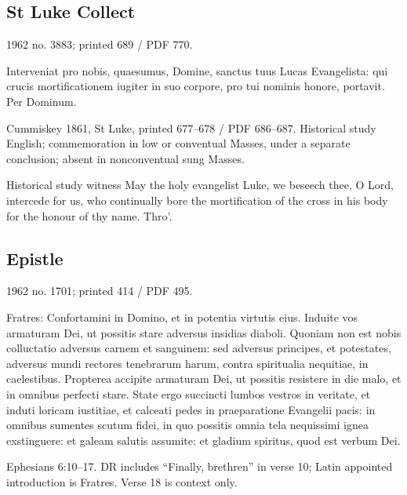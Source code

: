 \subsection{St Luke Collect}
\label{proper-luke-collect}

1962 no. 3883; printed 689 / PDF 770.

\begin{latinproper}
Interveniat pro nobis, quaesumus, Domine, sanctus tuus Lucas Evangelista: qui crucis mortificationem iugiter in suo corpore, pro tui nominis honore, portavit. Per Dominum.
\end{latinproper}

Cummiskey 1861, St Luke, printed 677–678 / PDF 686–687. Historical study English; commemoration in low or conventual Masses, under a separate conclusion; absent in nonconventual sung Masses.

\begin{englishwitness}{Historical study witness}
May the holy evangelist Luke, we beseech thee, O Lord, intercede for us, who continually bore the mortification of the cross in his body for the honour of thy name. Thro’.
\end{englishwitness}

\subsection{Epistle}
\label{proper-epistle}

1962 no. 1701; printed 414 / PDF 495.

\begin{latinproper}
Fratres: Confortamini in Domino, et in potentia virtutis eius. Induite vos armaturam Dei, ut possitis stare adversus insidias diaboli. Quoniam non est nobis colluctatio adversus carnem et sanguinem: sed adversus principes, et potestates, adversus mundi rectores tenebrarum harum, contra spiritualia nequitiae, in caelestibus. Propterea accipite armaturam Dei, ut possitis resistere in die malo, et in omnibus perfecti stare. State ergo succincti lumbos vestros in veritate, et induti loricam iustitiae, et calceati pedes in praeparatione Evangelii pacis: in omnibus sumentes scutum fidei, in quo possitis omnia tela nequissimi ignea exstinguere: et galeam salutis assumite: et gladium spiritus, quod est verbum Dei.
\end{latinproper}

Ephesians 6:10–17. DR includes “Finally, brethren” in verse 10; Latin appointed introduction is Fratres. Verse 18 is context only.

